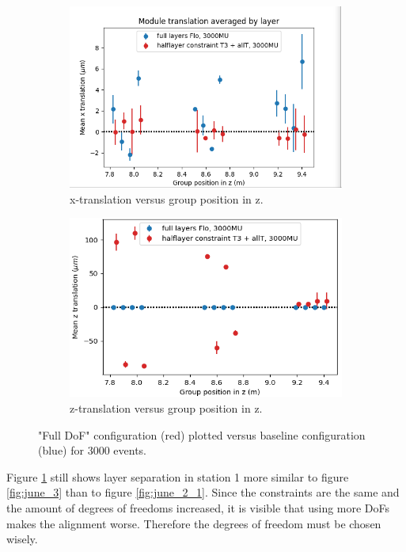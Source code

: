 \begin{figure}
  \centering
  \begin{subfigure}[b]{0.4\textwidth}
    \centering
    \includegraphics[width=\textwidth]{plots/june_21/allT_halfT3_Tx_vs_Flo.png}
    \caption{x-translation versus group position in z.}
    \label{fig:june_4_1}
  \end{subfigure}
  \hfill
  \begin{subfigure}[b]{0.4\textwidth}
    \centering
    \includegraphics[width=\textwidth]{plots/scatter_fig4_2.png}
    \caption{z-translation versus group position in z.}
    \label{fig:june_4_2}
  \end{subfigure}
  \caption{"Full DoF" configuration (red) plotted versus baseline configuration (blue) for 3000 events.}
  \label{fig:june_4}
\end{figure}

Figure \ref{fig:june_4_1} still shows layer separation in station 1 more similar to figure \ref{fig:june_3} than to figure \ref{fig:june_2_1}.
Since the constraints are the same and the amount of degrees of freedoms increased,
it is visible that using more DoFs makes the alignment worse. Therefore the degrees of freedom must be chosen wisely.

